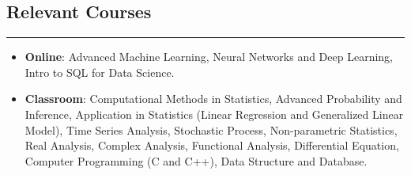 \documentclass[10pt, oneside]{article}
\begin{document}
\subsection*{Relevant Courses}
\noindent\rule{\textwidth}{1pt}
\begin{itemize}[itemsep=-1pt]
    \item \textbf{Online}: Advanced Machine Learning, Neural Networks and Deep Learning, Intro to SQL for Data Science.\\[-10pt]
    \item \textbf{Classroom}: Computational Methods in Statistics, Advanced Probability and Inference, Application in Statistics (Linear Regression and Generalized Linear Model), Time Series Analysis, Stochastic Process, Non-parametric Statistics, Real Analysis, Complex Analysis, Functional Analysis, Differential Equation, Computer Programming (C and C++), Data Structure and Database.
\end{itemize}
\end{document}
